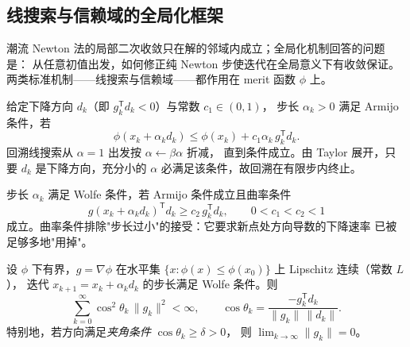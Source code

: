 \subsection{线搜索与信赖域的全局化框架}\label{sec:pf-th-glob-framework}

潮流 Newton 法的局部二次收敛只在解的邻域内成立；全局化机制回答的问题是：
从任意初值出发，如何修正纯 Newton 步使迭代在全局意义下有收敛保证。
两类标准机制——线搜索与信赖域——都作用在 merit 函数 $\phi$ 上。

\begin{definition}\label{sec:pf-th-glob-def-armijo}
给定下降方向 $d_k$（即 $g_k^{\mathsf T}d_k<0$）与常数 $c_1\in(0,1)$，
步长 $\alpha_k>0$ 满足 Armijo 条件，若
\begin{equation}
\phi(x_k+\alpha_k d_k)\le \phi(x_k)+c_1\alpha_k\,g_k^{\mathsf T}d_k .
\end{equation}
回溯线搜索从 $\alpha=1$ 出发按 $\alpha\leftarrow\beta\alpha$ 折减，
直到条件成立。由 Taylor 展开，只要 $d_k$ 是下降方向，充分小的 $\alpha$
必满足该条件，故回溯在有限步内终止。
\end{definition}

\begin{definition}[Wolfe 条件]\label{sec:pf-th-glob-def-wolfe}
步长 $\alpha_k$ 满足 Wolfe 条件，若 Armijo 条件成立且曲率条件
\begin{equation}
g(x_k+\alpha_k d_k)^{\mathsf T}d_k\ge c_2\,g_k^{\mathsf T}d_k,
\qquad 0<c_1<c_2<1
\end{equation}
成立。曲率条件排除"步长过小"的接受：它要求新点处方向导数的下降速率
已被足够多地"用掉"。
\end{definition}

\begin{theorem}\label{sec:pf-th-glob-thm-zoutendijk}
设 $\phi$ 下有界，$g=\nabla\phi$ 在水平集
$\{x:\phi(x)\le\phi(x_0)\}$ 上 Lipschitz 连续（常数 $L$），
迭代 $x_{k+1}=x_k+\alpha_k d_k$ 的步长满足 Wolfe 条件。则
\begin{equation}
\sum_{k=0}^{\infty}\cos^2\theta_k\,\lVert g_k\rVert^2<\infty,
\qquad
\cos\theta_k=\frac{-g_k^{\mathsf T}d_k}{\lVert g_k\rVert\,\lVert d_k\rVert}.
\end{equation}
特别地，若方向满足\emph{夹角条件} $\cos\theta_k\ge\delta>0$，
则 $\lim_{k\to\infty}\lVert g_k\rVert=0$。
\end{theorem}

